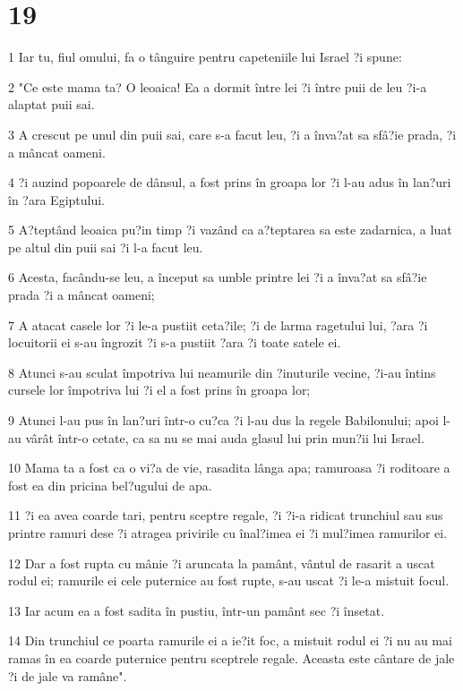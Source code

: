 \chapter{19}

\par 1 Iar tu, fiul omului, fa o tânguire pentru capeteniile lui Israel ?i spune:
\par 2 "Ce este mama ta? O leoaica! Ea a dormit între lei ?i între puii de leu ?i-a alaptat puii sai.
\par 3 A crescut pe unul din puii sai, care s-a facut leu, ?i a înva?at sa sfâ?ie prada, ?i a mâncat oameni.
\par 4 ?i auzind popoarele de dânsul, a fost prins în groapa lor ?i l-au adus în lan?uri în ?ara Egiptului.
\par 5 A?teptând leoaica pu?in timp ?i vazând ca a?teptarea sa este zadarnica, a luat pe altul din puii sai ?i l-a facut leu.
\par 6 Acesta, facându-se leu, a început sa umble printre lei ?i a înva?at sa sfâ?ie prada ?i a mâncat oameni;
\par 7 A atacat casele lor ?i le-a pustiit ceta?ile; ?i de larma ragetului lui, ?ara ?i locuitorii ei s-au îngrozit ?i s-a pustiit ?ara ?i toate satele ei.
\par 8 Atunci s-au sculat împotriva lui neamurile din ?inuturile vecine, ?i-au întins cursele lor împotriva lui ?i el a fost prins în groapa lor;
\par 9 Atunci l-au pus în lan?uri într-o cu?ca ?i l-au dus la regele Babilonului; apoi l-au vârât într-o cetate, ca sa nu se mai auda glasul lui prin mun?ii lui Israel.
\par 10 Mama ta a fost ca o vi?a de vie, rasadita lânga apa; ramuroasa ?i roditoare a fost ea din pricina bel?ugului de apa.
\par 11 ?i ea avea coarde tari, pentru sceptre regale, ?i ?i-a ridicat trunchiul sau sus printre ramuri dese ?i atragea privirile cu înal?imea ei ?i mul?imea ramurilor ei.
\par 12 Dar a fost rupta cu mânie ?i aruncata la pamânt, vântul de rasarit a uscat rodul ei; ramurile ei cele puternice au fost rupte, s-au uscat ?i le-a mistuit focul.
\par 13 Iar acum ea a fost sadita în pustiu, într-un pamânt sec ?i însetat.
\par 14 Din trunchiul ce poarta ramurile ei a ie?it foc, a mistuit rodul ei ?i nu au mai ramas în ea coarde puternice pentru sceptrele regale. Aceasta este cântare de jale ?i de jale va ramâne".


